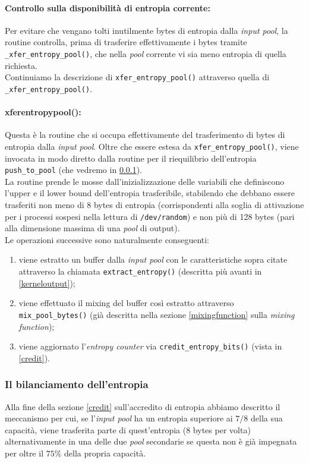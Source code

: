 \documentclass{article}
\begin{document}
 \paragraph{Controllo sulla disponibilità di entropia corrente:} Per evitare
 che vengano tolti inutilmente bytes di entropia dalla \emph{input pool}, la
 routine controlla, prima di trasferire effettivamente i bytes tramite
 \verb+_xfer_entropy_pool()+, che nella \emph{pool} corrente vi sia meno
 entropia di quella richiesta. \\Continuiamo la descrizione di
 \verb+xfer_entropy_pool()+ attraverso quella di \verb+_xfer_entropy_pool()+.
 
 \paragraph{\textunderscore{}xfer\textunderscore{}entropy\textunderscore{}pool():}
 Questa è la routine che si occupa effettivamente del trasferimento di bytes di
 entropia dalla \emph{input pool}. Oltre che essere estesa da
 \verb+xfer_entropy_pool()+, viene invocata in modo diretto dalla routine per il
 riequilibrio dell'entropia \verb+push_to_pool+ (che
 vedremo in \ref{bilanciamento}).\\
 La routine prende le mosse dall'inizializzazione delle variabili che
 definiscono l'upper e il lower bound dell'entropia trasferibile, stabilendo che
 debbano essere trasferiti non meno di 8 bytes di entropia (corrispondenti alla
 soglia di attivazione per i processi sospesi nella lettura di
 \verb+/dev/random+) e non più di 128 bytes (pari alla dimensione massima di
 una \emph{pool} di output).\\
 Le operazioni successive sono naturalmente conseguenti: 
 \begin{enumerate}
   \item viene estratto un buffer dalla \emph{input pool} con le caratteristiche
   sopra citate attraverso la chiamata \verb+extract_entropy()+ (descritta più
   avanti in \ref{kerneloutput});
   \item viene effettuato il mixing del buffer così estratto attraverso
   \verb+mix_pool_bytes()+ (già descritta nella sezione
   \ref{mixingfunction} sulla \emph{mixing function});
   \item viene aggiornato l'\emph{entropy counter} via
   \verb+credit_entropy_bits()+ (vista in \ref{credit}).
 \end{enumerate}
 
 \subsubsection{Il bilanciamento dell'entropia} \label{bilanciamento}
 Alla fine della sezione \ref{credit} sull'accredito di entropia abbiamo
 descritto il meccanismo per cui, se l'\emph{input pool} ha un entropia
 superiore ai $7/8$ della sua capacità, viene trasferita parte di quest'entropia
 (8 bytes per volta) alternativamente in una delle due \emph{pool} secondarie se
 questa non è già impegnata per oltre il $75\%$ della propria capacità.
\end{document}
